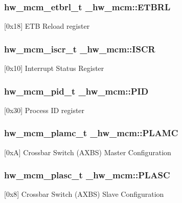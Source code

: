 \subsubsection[{\texorpdfstring{E\+T\+B\+RL}{ETBRL}}]{ {\bf hw\+\_\+mcm\+\_\+etbrl\+\_\+t} \+\_\+hw\+\_\+mcm\+::\+E\+T\+B\+RL}\hypertarget{struct__hw__mcm_ae5c97c5ce711df944d6ad5faaec4ceb7}{}\label{struct__hw__mcm_ae5c97c5ce711df944d6ad5faaec4ceb7}
\mbox{[}0x18\mbox{]} E\+TB Reload register 
\subsubsection[{\texorpdfstring{I\+S\+CR}{ISCR}}]{ {\bf hw\+\_\+mcm\+\_\+iscr\+\_\+t} \+\_\+hw\+\_\+mcm\+::\+I\+S\+CR}\hypertarget{struct__hw__mcm_a310f77d82632d377ce7ea9567acd147f}{}\label{struct__hw__mcm_a310f77d82632d377ce7ea9567acd147f}
\mbox{[}0x10\mbox{]} Interrupt Status Register 
\subsubsection[{\texorpdfstring{P\+ID}{PID}}]{ {\bf hw\+\_\+mcm\+\_\+pid\+\_\+t} \+\_\+hw\+\_\+mcm\+::\+P\+ID}\hypertarget{struct__hw__mcm_a475d7d2a5da2fa95dc65b2767dd6ff3c}{}\label{struct__hw__mcm_a475d7d2a5da2fa95dc65b2767dd6ff3c}
\mbox{[}0x30\mbox{]} Process ID register 
\subsubsection[{\texorpdfstring{P\+L\+A\+MC}{PLAMC}}]{ {\bf hw\+\_\+mcm\+\_\+plamc\+\_\+t} \+\_\+hw\+\_\+mcm\+::\+P\+L\+A\+MC}\hypertarget{struct__hw__mcm_a4e079f3fd83c37f73d324e6ff6dcde17}{}\label{struct__hw__mcm_a4e079f3fd83c37f73d324e6ff6dcde17}
\mbox{[}0xA\mbox{]} Crossbar Switch (A\+X\+BS) Master Configuration 
\subsubsection[{\texorpdfstring{P\+L\+A\+SC}{PLASC}}]{ {\bf hw\+\_\+mcm\+\_\+plasc\+\_\+t} \+\_\+hw\+\_\+mcm\+::\+P\+L\+A\+SC}\hypertarget{struct__hw__mcm_ab2a19c143794d39a2229b3df90b540ac}{}\label{struct__hw__mcm_ab2a19c143794d39a2229b3df90b540ac}
\mbox{[}0x8\mbox{]} Crossbar Switch (A\+X\+BS) Slave Configuration 

